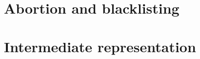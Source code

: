 
\section{Abortion and blacklisting}
\label{Sec:abort}


\section{Intermediate representation}
\label{Sec:IR}




